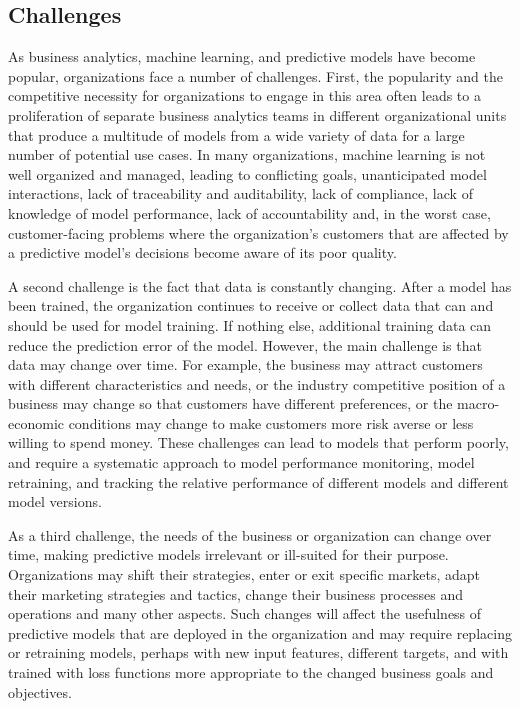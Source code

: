 \subsection*{Challenges}

As business analytics, machine learning, and predictive models have become popular, organizations face a number of challenges. First, the popularity and the competitive necessity for organizations to engage in this area often leads to a proliferation of separate business analytics teams in different organizational units that produce a multitude of models from a wide variety of data for a large number of potential use cases. In many organizations, machine learning is not well organized and managed, leading to conflicting goals, unanticipated model interactions, lack of traceability and auditability, lack of compliance, lack of knowledge of model performance, lack of accountability and, in the worst case, customer-facing problems where the organization's customers that are affected by a predictive model's decisions become aware of its poor quality. 

A second challenge is the fact that data is constantly changing. After a model has been trained, the organization continues to receive or collect data that can and should be used for model training. If nothing else, additional training data can reduce the prediction error of the model. However, the main challenge is that data may change over time. For example, the business may attract customers with different characteristics and needs, or the industry competitive position of a business may change so that customers have different preferences, or the macro-economic conditions may change to make customers more risk averse or less willing to spend money. These challenges can lead to models that perform poorly, and require a systematic approach to model performance monitoring, model retraining, and tracking the relative performance of different models and different model versions.

As a third challenge, the needs of the business or organization can change over time, making predictive models irrelevant or ill-suited for their purpose. Organizations may shift their strategies, enter or exit specific markets, adapt their marketing strategies and tactics, change their business processes and operations and many other aspects. Such changes will affect the usefulness of predictive models that are deployed in the organization and may require replacing or retraining models, perhaps with new input features, different targets, and with trained with loss functions more appropriate to the changed business goals and objectives. 

